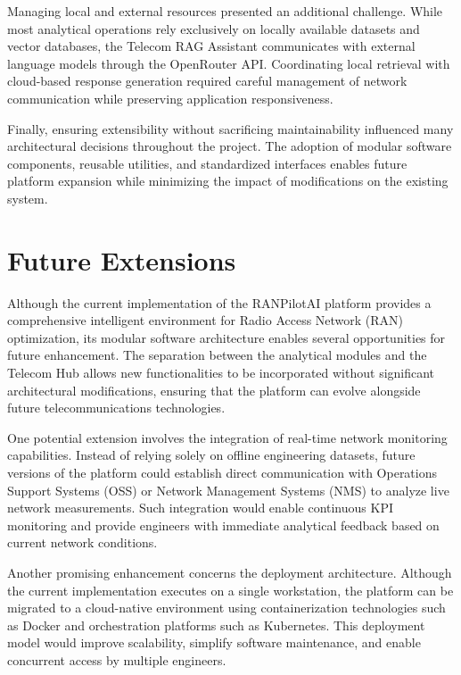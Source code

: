 Managing local and external resources presented an additional challenge. While most analytical operations rely exclusively on locally available datasets and vector databases, the Telecom RAG Assistant communicates with external language models through the OpenRouter API. Coordinating local retrieval with cloud-based response generation required careful management of network communication while preserving application responsiveness.

Finally, ensuring extensibility without sacrificing maintainability influenced many architectural decisions throughout the project. The adoption of modular software components, reusable utilities, and standardized interfaces enables future platform expansion while minimizing the impact of modifications on the existing system.
\section{Future Extensions}

Although the current implementation of the RANPilotAI platform provides a comprehensive intelligent environment for Radio Access Network (RAN) optimization, its modular software architecture enables several opportunities for future enhancement. The separation between the analytical modules and the Telecom Hub allows new functionalities to be incorporated without significant architectural modifications, ensuring that the platform can evolve alongside future telecommunications technologies.

One potential extension involves the integration of real-time network monitoring capabilities. Instead of relying solely on offline engineering datasets, future versions of the platform could establish direct communication with Operations Support Systems (OSS) or Network Management Systems (NMS) to analyze live network measurements. Such integration would enable continuous KPI monitoring and provide engineers with immediate analytical feedback based on current network conditions.

Another promising enhancement concerns the deployment architecture. Although the current implementation executes on a single workstation, the platform can be migrated to a cloud-native environment using containerization technologies such as Docker and orchestration platforms such as Kubernetes. This deployment model would improve scalability, simplify software maintenance, and enable concurrent access by multiple engineers.

